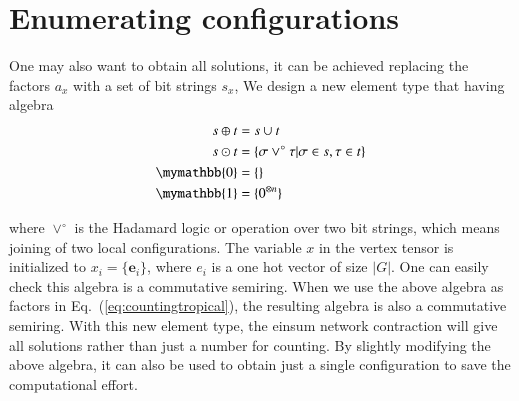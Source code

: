 \documentclass[review,onefignum,onetabnum]{siamart190516}
\newcommand{\<}{\langle}
\renewcommand{\>}{\rangle}
\newcommand{\Eq}[1]{Eq.~(\ref{#1})}
\begin{document}
\section{Enumerating configurations}
One may also want to obtain all solutions, it can be achieved replacing the factors $a_x$ with a set of bit strings $s_x$,
We design a new element type that having algebra
\begin{align}
\begin{split}
    s \oplus t &= s \cup t\\
    s \odot t &= \{\sigma \lor^\circ \tau | \sigma \in s, \tau \in t\}\\
    \mymathbb{0} &= \{\}\\
    \mymathbb{1} &= \{0^{\otimes n}\}
\end{split}\label{eq:set}
\end{align}

where $\lor^\circ$ is the Hadamard logic or operation over two bit strings, which means joining of two local configurations.
The variable $x$ in the vertex tensor is initialized to $x_i = \{\boldsymbol{e}_{i}\}$,
where $e_i$ is a one hot vector of size $|G|$.
One can easily check this algebra is a commutative semiring.
When we use the above algebra as factors in \Eq{eq:countingtropical}, the resulting algebra is also a commutative semiring.
With this new element type, the einsum network contraction will give all solutions rather than just a number for counting.
By slightly modifying the above algebra, it can also be used to obtain just a single configuration to save the computational effort.
\end{document}
